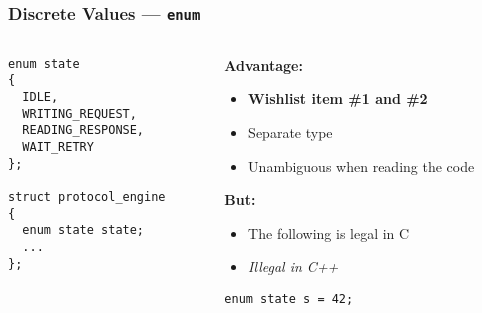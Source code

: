 \begin{frame}[fragile]
  \frametitle{Discrete Values --- \texttt{enum}}

  \begin{columns}[t]

    \begin{column}{.4\textwidth}

      \begin{block}{}
\begin{verbatim}
enum state
{
  IDLE,
  WRITING_REQUEST,
  READING_RESPONSE,
  WAIT_RETRY
};

struct protocol_engine
{
  enum state state;
  ...
};
\end{verbatim}
      \end{block}

    \end{column}

    \begin{column}{.5\textwidth}

      \textbf{Advantage:}

      \begin{itemize}
      \item \textbf{Wishlist item \#1 and \#2}
      \item Separate type
      \item Unambiguous when reading the code
      \end{itemize}

      \textbf{But:}

      \begin{itemize}
      \item The following is legal in C
      \item \textit{Illegal in C++}
      \end{itemize}

      \begin{block}{}
\begin{verbatim}
enum state s = 42;
\end{verbatim}
      \end{block}

    \end{column}
    
  \end{columns}

\end{frame}

